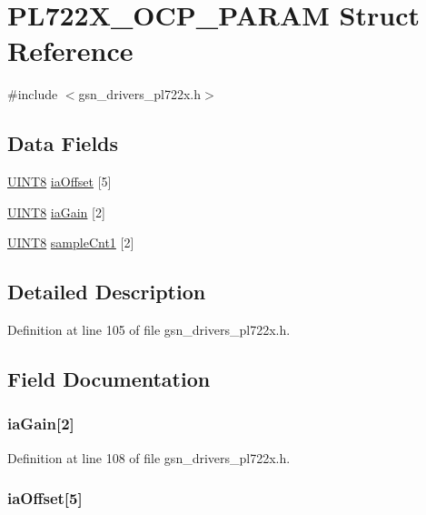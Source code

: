 \hypertarget{a00452}{
\section{PL722X\_\-OCP\_\-PARAM Struct Reference}
\label{a00452}
}


{\ttfamily \#include $<$gsn\_\-drivers\_\-pl722x.h$>$}

\subsection*{Data Fields}
\begin{DoxyCompactItemize}
\item 
\hyperlink{a00660_gab27e9918b538ce9d8ca692479b375b6a}{UINT8} \hyperlink{a00452_abd18d1cb79280996b118f474ac8b2063}{iaOffset} \mbox{[}5\mbox{]}
\item 
\hyperlink{a00660_gab27e9918b538ce9d8ca692479b375b6a}{UINT8} \hyperlink{a00452_ade0117f8c0167462d20786106de31090}{iaGain} \mbox{[}2\mbox{]}
\item 
\hyperlink{a00660_gab27e9918b538ce9d8ca692479b375b6a}{UINT8} \hyperlink{a00452_a21b9a903ac28ed8f684af16275f0cfdb}{sampleCnt1} \mbox{[}2\mbox{]}
\end{DoxyCompactItemize}


\subsection{Detailed Description}


Definition at line 105 of file gsn\_\-drivers\_\-pl722x.h.



\subsection{Field Documentation}
\hypertarget{a00452_ade0117f8c0167462d20786106de31090}{
\subsubsection[{iaGain}]{ {\bf iaGain}\mbox{[}2\mbox{]}}}
\label{a00452_ade0117f8c0167462d20786106de31090}


Definition at line 108 of file gsn\_\-drivers\_\-pl722x.h.

\hypertarget{a00452_abd18d1cb79280996b118f474ac8b2063}{
\subsubsection[{iaOffset}]{ {\bf iaOffset}\mbox{[}5\mbox{]}}}
\label{a00452_abd18d1cb79280996b118f474ac8b2063}



